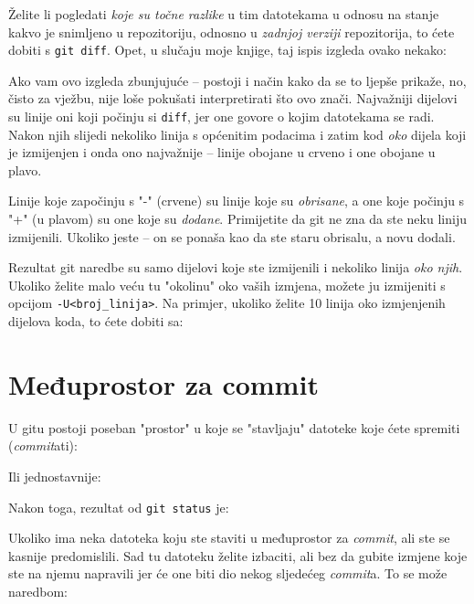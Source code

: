 Želite li pogledati \emph{koje su točne razlike} u tim datotekama u odnosu na stanje kakvo je snimljeno u repozitoriju, odnosno u \emph{zadnjoj verziji} repozitorija, to ćete dobiti s \verb+git diff+. 
Opet, u slučaju moje knjige, taj ispis izgleda ovako nekako:



Ako vam ovo izgleda zbunjujuće -- postoji i način kako da se to ljepše prikaže, no, čisto za vježbu, nije loše pokušati interpretirati što ovo znači.
Najvažniji dijelovi su linije oni koji počinju si \verb+diff+, jer one govore o kojim datotekama se radi.
Nakon njih slijedi nekoliko linija s općenitim podacima i zatim kod \emph{oko} dijela koji je izmijenjen i onda ono najvažnije -- linije obojane u crveno i one obojane u plavo.

Linije koje započinju s "-" (crvene) su linije koje su \emph{obrisane}, a one koje počinju s "+" (u plavom) su one koje su \emph{dodane}. 
Primijetite da git ne zna da ste neku liniju izmijenili. 
Ukoliko jeste -- on se ponaša kao da ste staru obrisalu, a novu dodali.

Rezultat git naredbe su samo dijelovi koje ste izmijenili i nekoliko linija \emph{oko njih}.
Ukoliko želite malo veću tu "okolinu" oko vaših izmjena, možete ju izmijeniti s opcijom \verb+-U<broj_linija>+.
Na primjer, ukoliko želite 10 linija oko izmjenjenih dijelova koda, to ćete dobiti sa:


\section*{Međuprostor za commit}

U gitu postoji poseban "prostor" u koje se "stavljaju" datoteke koje ćete spremiti (\emph{commit}ati):



Ili jednostavnije:



Nakon toga, rezultat od \verb+git status+ je:



Ukoliko ima neka datoteka koju ste staviti u međuprostor za \emph{commit}, ali ste se kasnije predomislili. 
Sad tu datoteku želite izbaciti, ali bez da gubite izmjene koje ste na njemu napravili jer će one biti dio nekog sljedećeg \emph{commit}a.
To se može naredbom:

